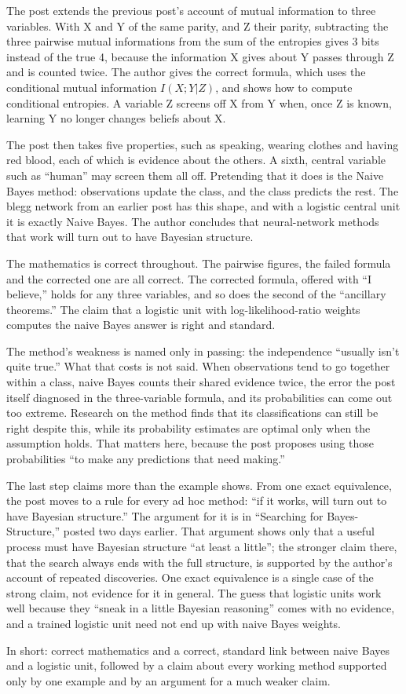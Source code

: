 \begin{afterword}
\summaryhead

The post extends the previous post's account of mutual information to three variables. With X and Y of the same parity, and Z their parity, subtracting the three pairwise mutual informations from the sum of the entropies gives 3 bits instead of the true 4, because the information X gives about Y passes through Z and is counted twice. The author gives the correct formula, which uses the conditional mutual information $I(X;Y|Z)$, and shows how to compute conditional entropies. A variable Z screens off X from Y when, once Z is known, learning Y no longer changes beliefs about X.

The post then takes five properties, such as speaking, wearing clothes and having red blood, each of which is evidence about the others. A sixth, central variable such as ``human'' may screen them all off. Pretending that it does is the Naive Bayes method: observations update the class, and the class predicts the rest. The blegg network from an earlier post has this shape, and with a logistic central unit it is exactly Naive Bayes. The author concludes that neural-network methods that work will turn out to have Bayesian structure.

\responsehead

The mathematics is correct throughout. The pairwise figures, the failed formula and the corrected one are all correct. The corrected formula, offered with ``I believe,'' holds for any three variables, and so does the second of the ``ancillary theorems.'' The claim that a logistic unit with log-likelihood-ratio weights computes the naive Bayes answer is right and standard.

The method's weakness is named only in passing: the independence ``usually isn't quite true.'' What that costs is not said. When observations tend to go together within a class, naive Bayes counts their shared evidence twice, the error the post itself diagnosed in the three-variable formula, and its probabilities can come out too extreme. Research on the method finds that its classifications can still be right despite this, while its probability estimates are optimal only when the assumption holds. That matters here, because the post proposes using those probabilities ``to make any predictions that need making.''

The last step claims more than the example shows. From one exact equivalence, the post moves to a rule for every ad hoc method: ``if it works, will turn out to have Bayesian structure.'' The argument for it is in ``Searching for Bayes-Structure,'' posted two days earlier. That argument shows only that a useful process must have Bayesian structure ``at least a little''; the stronger claim there, that the search always ends with the full structure, is supported by the author's account of repeated discoveries. One exact equivalence is a single case of the strong claim, not evidence for it in general. The guess that logistic units work well because they ``sneak in a little Bayesian reasoning'' comes with no evidence, and a trained logistic unit need not end up with naive Bayes weights.

In short: correct mathematics and a correct, standard link between naive Bayes and a logistic unit, followed by a claim about every working method supported only by one example and by an argument for a much weaker claim.
\end{afterword}
